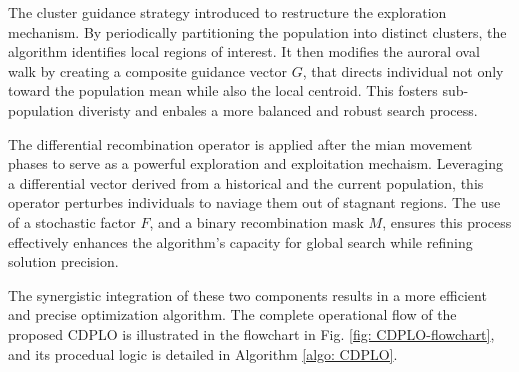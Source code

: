 \documentclass[review]{elsarticle}
\begin{document}
The cluster guidance strategy introduced to restructure the exploration mechanism. By periodically partitioning the population into distinct clusters, the algorithm identifies local regions of interest. It then modifies the auroral oval walk by creating a composite guidance vector $G$, that directs individual not only toward the population mean while also the local centroid. This fosters sub-population diveristy and enbales a more balanced and robust search process.

The differential recombination operator is applied after the mian movement phases to serve as a powerful exploration and exploitation mechaism. Leveraging a differential vector derived from a historical and the current population, this operator perturbes individuals to naviage them out of stagnant regions. The use of a stochastic factor $F$, and a binary recombination mask $M$, ensures this process effectively enhances the algorithm's capacity for global search while refining solution precision.

The synergistic integration of these two components results in a more efficient and precise optimization algorithm. The complete operational flow of the proposed CDPLO is illustrated in the flowchart in Fig. \ref{fig: CDPLO-flowchart}, and its procedual logic is detailed in Algorithm \ref{algo: CDPLO}.
\end{document}
